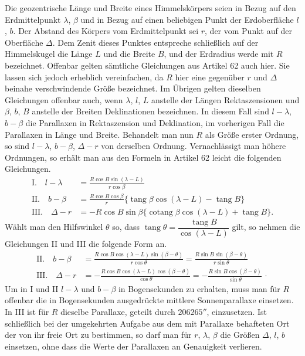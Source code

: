 Die geozentrische Länge und Breite eines Himmelskörpers seien in Bezug auf den Erdmittelpunkt $\lambda$, $\beta$ und in Bezug auf einen beliebigen Punkt der Erdoberfläche $l$, $b$. Der Abstand des Körpers vom Erdmittelpunkt sei $r$, der vom Punkt auf der Oberfläche $\Delta$. Dem Zenit dieses Punktes entspreche schließlich auf der Himmelskugel die Länge $L$ und die Breite $B$, und der Erdradius werde mit $R$ bezeichnet. Offenbar gelten sämtliche Gleichungen aus Artikel 62 auch hier. Sie lassen sich jedoch erheblich vereinfachen, da $R$ hier eine gegenüber $r$ und $\Delta$ beinahe verschwindende Größe bezeichnet. Im Übrigen gelten dieselben Gleichungen offenbar auch, wenn $\lambda$, $l$, $L$ anstelle der Längen Rektaszensionen und $\beta$, $b$, $B$ anstelle der Breiten Deklinationen bezeichnen. In diesem Fall sind $l-\lambda$, $b-\beta$ die Parallaxen in Rektaszension und Deklination, im vorherigen Fall die Parallaxen in Länge und Breite. Behandelt man nun $R$ als Größe erster Ordnung, so sind $l-\lambda$, $b-\beta$, $\Delta-r$ von derselben Ordnung. Vernachlässigt man höhere Ordnungen, so erhält man aus den Formeln in Artikel 62 leicht die folgenden Gleichungen.
\[
\begin{aligned}
\mathrm{I.}\quad l-\lambda&=\frac{R\cos B\sin(\lambda-L)}{r\cos\beta}\\[.5em]
\mathrm{II.}\quad b-\beta&=\frac{R\cos B\cos\beta}{r}\{\operatorname{tang}\beta\cos(\lambda-L)-\operatorname{tang}B\}\\[.5em]
\mathrm{III.}\quad \Delta-r&=-R\cos B\sin\beta\{\operatorname{cotang}\beta\cos(\lambda-L)+\operatorname{tang}B\}.
\end{aligned}
\]
\noindent Wählt man den Hilfswinkel $\theta$ so, dass $\operatorname{tang}\theta=\dfrac{\operatorname{tang}B}{\cos(\lambda-L)}$ gilt, so nehmen die Gleichungen II und III die folgende Form an.
\[
\begin{aligned}
\mathrm{II.}\quad b-\beta&=\frac{R\cos B\cos(\lambda-L)\sin(\beta-\theta)}{r\cos\theta}=\frac{R\sin B\sin(\beta-\theta)}{r\sin\theta}\\[.5em]
\mathrm{III.}\quad \Delta-r&=-\frac{R\cos B\cos(\lambda-L)\cos(\beta-\theta)}{\cos\theta}=-\frac{R\sin B\cos(\beta-\theta)}{\sin\theta}\,\cdot
\end{aligned}
\]
\noindent Um in I und II $l-\lambda$ und $b-\beta$ in Bogensekunden zu erhalten, muss man für $R$ offenbar die in Bogensekunden ausgedrückte mittlere Sonnenparallaxe einsetzen. In III ist für $R$ dieselbe Parallaxe, geteilt durch $206265''$, einzusetzen. Ist schließlich bei der umgekehrten Aufgabe aus dem mit Parallaxe behafteten Ort der von ihr freie Ort zu bestimmen, so darf man für $r$, $\lambda$, $\beta$ die Größen $\Delta$, $l$, $b$ einsetzen, ohne dass die Werte der Parallaxen an Genauigkeit verlieren.

